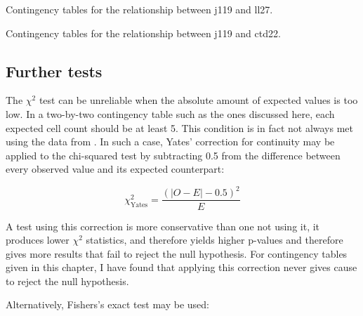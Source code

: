 \begin{table}[h]
  \centering
  \hfill
  
  \caption{Contingency tables for the relationship between \gls{j119} and \gls{ll27}.}
  \label{tab:continj119ll27}
\end{table}

\begin{table}[h]
  \centering
  \hfill

  \caption{Contingency tables for the relationship between \gls{j119} and \gls{ctd22}.}
  \label{tab:continctd22j119}
\end{table}

\subsection{Further tests}
\label{sec:further-tests}

The \(\chi^2\) test can be unreliable when the absolute amount of expected values is too low. In a two-by-two contingency table such as the ones discussed here, each expected cell count should be at least 5. This condition is in fact not always met using the data from . In such a case, Yates' correction for continuity may be applied to the chi-squared test by subtracting 0.5 from the difference between every observed value and its expected counterpart:

\[\chi_\text{Yates}^2 =  \frac{(|O - E| - 0.5)^2}{E}\]

A test using this correction is more conservative than one not using it, \ie it produces lower \(\chi^2\) statistics, and therefore yields higher p-values and therefore gives more results that fail to reject the null hypothesis. For contingency tables given in this chapter, I have found that applying this correction never gives cause to reject the null hypothesis.

Alternatively, Fishers's exact test may be used:

